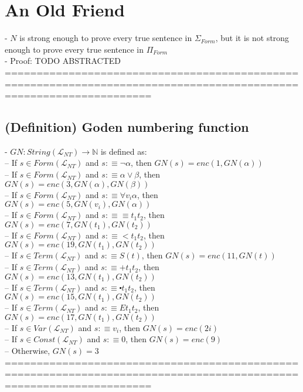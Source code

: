 \documentclass{book}
\newcommand{\is}{:\equiv}
\begin{document}
\section{An Old Friend}
	- $N$ is strong enough to prove every true sentence in $\Sigma_{Form}$, but it is not strong enough to prove every true sentence in $\Pi_{Form}$ \\
		- Proof: TODO ABSTRACTED \\
	===================================================================================================================

\subsection{(Definition) Goden numbering function} %
	- $GN: String(\mathcal{L}_{NT}) \rightarrow \mathbb{N}$ is defined as: \\
	-- If $s \in Form(\mathcal{L}_{NT})$ and $s \is \lnot \alpha$,       then $GN(s) = enc(1, GN(\alpha))$ \\
	-- If $s \in Form(\mathcal{L}_{NT})$ and $s \is \alpha \lor \beta$,  then $GN(s) = enc(3, GN(\alpha), GN(\beta))$ \\
	-- If $s \in Form(\mathcal{L}_{NT})$ and $s \is \forall v_i \alpha$, then $GN(s) = enc(5, GN(v_i), GN(\alpha))$ \\
	-- If $s \in Form(\mathcal{L}_{NT})$ and $s \is \equiv t_1 t_2$,     then $GN(s) = enc(7, GN(t_1), GN(t_2))$ \\
	-- If $s \in Form(\mathcal{L}_{NT})$ and $s \is < t_1 t_2$,          then $GN(s) = enc(19, GN(t_1), GN(t_2))$ \\
	-- If $s \in Term(\mathcal{L}_{NT})$ and $s \is S(t)$,               then $GN(s) = enc(11, GN(t))$ \\
	-- If $s \in Term(\mathcal{L}_{NT})$ and $s \is + t_1 t_2$,          then $GN(s) = enc(13, GN(t_1), GN(t_2))$ \\
	-- If $s \in Term(\mathcal{L}_{NT})$ and $s \is \centerdot t_1 t_2$, then $GN(s) = enc(15, GN(t_1), GN(t_2))$ \\
	-- If $s \in Term(\mathcal{L}_{NT})$ and $s \is E t_1 t_2$,          then $GN(s) = enc(17, GN(t_1), GN(t_2))$ \\
	-- If $s \in Var(\mathcal{L}_{NT})$ and $s \is v_i$,                 then $GN(s) = enc(2i)$ \\
	-- If $s \in Const(\mathcal{L}_{NT})$ and $s \is 0$,                 then $GN(s) = enc(9)$ \\
	-- Otherwise,                                                             $GN(s) = 3$ \\
	===================================================================================================================
\end{document}
